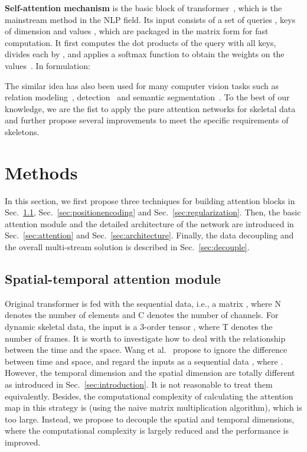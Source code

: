 \documentclass[runningheads]{llncs}
\begin{document}
\textbf{Self-attention mechanism} is the basic block of transformer~\cite{vaswani_attention_2017,dai_transformer-xl:_2019}, which is the mainstream method in the NLP field. 
Its input consists of a set of queries , keys  of dimension  and values , which are packaged in the matrix form for fast computation. 
It first computes the dot products of the query with all keys, divides each by , and applies a softmax function to obtain the weights on the values~\cite{vaswani_attention_2017}. 
In formulation: 

The similar idea has also been used for many computer vision tasks such as relation modeling~\cite{santoro_simple_2017}, detection~\cite{hu_relation_2018} and semantic segmentation~\cite{fu_dual_2019}. 
To the best of our knowledge, we are the fist to apply the pure attention networks for skeletal data and further propose several improvements to meet the specific requirements of skeletons. 







\section{Methods}
In this section, we first propose three techniques for building attention blocks in Sec.~\ref{sec:strategies}, Sec.~\ref{sec:positionencoding} and Sec.~\ref{sec:regularization}. 
Then, the basic attention module and the detailed architecture of the network are introduced in Sec.~\ref{sec:attention} and Sec.~\ref{sec:architecture}. 
Finally, the data decoupling and the overall multi-stream solution is described in Sec.~\ref{sec:decouple}. 



\subsection{Spatial-temporal attention module}
\label{sec:strategies}
Original transformer is fed with the sequential data, i.e., a matrix , where N denotes the number of elements and C denotes the number of channels. 
For dynamic skeletal data, the input is a 3-order tensor , where T denotes the number of frames. 
It is worth to investigate how to deal with the relationship between the time and the space. 
Wang et al.~\cite{wang_non-local_2018} propose to ignore the difference between time and space, and regard the inputs as a sequential data , where . 
However, the temporal dimension and the spatial dimension are totally different as introduced in Sec.~\ref{sec:introduction}.
It is not reasonable to treat them equivalently. 
Besides, the computational complexity of calculating the attention map in this strategy is  (using the naive matrix multiplication algorithm), which is too large. 
Instead, we propose to decouple the spatial and temporal dimensions, where the computational complexity is largely reduced and the performance is improved. 
\end{document}
